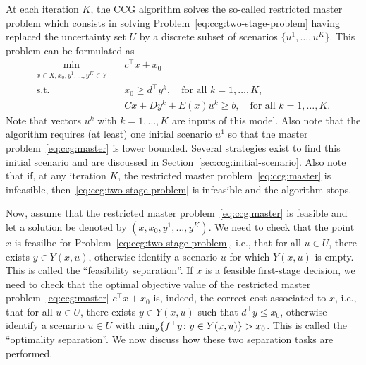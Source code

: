 At each iteration $K$, the CCG algorithm solves the so-called restricted
master problem which consists in solving
Problem~\eqref{eq:ccg:two-stage-problem} having replaced the uncertainty set
$U$ by a discrete subset of scenarios $\{ u^1, \dotsc, u^K \}$. This problem
can be formulated as  
\begin{subequations}
    \label{eq:ccg:master}
    \begin{align}
        \min_{x\in X, x_0, y^1, \dotsc, y^K\in\tilde{Y}} \quad & c^\top x + x_0 \\
        \text{s.t.} \quad & x_0 \ge d^\top y^k, \quad \text{for all } k=1,\dotsc,K, \\
        & Cx + Dy^k + E(x)u^k \ge b, \quad \text{for all } k=1,\dotsc,K.
    \end{align}
\end{subequations}
Note that vectors $u^k$ with $k=1,\dotsc,K$ are inputs of this model. Also
note that the algorithm requires (at least) one initial scenario $u^1$ so that
the master problem~\eqref{eq:ccg:master} is lower bounded. Several strategies
exist to find this initial scenario and are discussed in
Section~\ref{sec:ccg:initial-scenario}.  Also note
that if, at any iteration $K$, the restricted master
problem~\eqref{eq:ccg:master} is infeasible,
then~\eqref{eq:ccg:two-stage-problem} is infeasible and the algorithm stops.

Now, assume that the restricted master problem~\eqref{eq:ccg:master} is
feasible and let a solution be denoted by $(x,x_0,y^1,\dotsc,y^K)$. We need to
check that the point $x$ is feasilbe for
Problem~\eqref{eq:ccg:two-stage-problem}, i.e., that for all $u\in U$, there
exists $y\in Y(x,u)$, otherwise identify a scenario $u$ for which $Y(x,u)$ is
empty. This is called the ``feasibility separation''. If $x$ is a feasible
first-stage decision, we need to check that the optimal objective value of the
restricted master problem~\eqref{eq:ccg:master} $c^\top x + x_0$ is, indeed,
the correct cost associated to $x$, i.e., that for all $u\in U$, there exists
$y\in Y(x,u)$ such that $d^\top y \le x_0$, otherwise identify a scenario
$u\in U$ with $\min_y\{ f^\top y \colon y\in Y(x,u) \} > x_0$. This is called
the ``optimality separation''. We now discuss how these two separation tasks
are performed.


